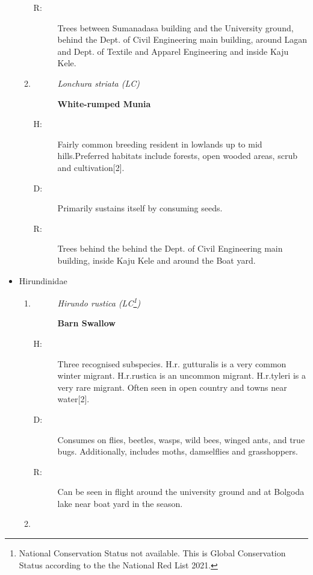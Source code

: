 \begin{itemize}
\begin{enumerate}
\begin{description}
\item[R: ]%
Trees between Sumanadasa building and the University ground, behind the Dept. of Civil Engineering main building, around Lagan and Dept. of Textile and Apparel Engineering and inside Kaju Kele.%
\end{description}%
\item%
\begin{description}%
\item[]%
\textit{Lonchura striata (LC)}%
\item[]%
\textbf{White{-}rumped Munia}%
\end{description}%
\begin{description}%
\item[H: ]%
Fairly common breeding resident in lowlands up to mid hills.Preferred habitats include forests, open wooded areas, scrub and cultivation{[}2{]}.%
\item[D: ]%
Primarily sustains itself by consuming seeds.%
\item[R: ]%
Trees behind the behind the Dept. of Civil Engineering main building, inside Kaju Kele and around the Boat yard.%
\end{description}%
\end{enumerate}%
\item%
Hirundinidae%
\begin{enumerate}%
\item%
\begin{description}%
\item[]%
\textit{Hirundo rustica (LC\footnote{National Conservation Status not available. This is Global Conservation Status according to the the National Red List 2021.})}%
\item[]%
\textbf{Barn Swallow}%
\end{description}%
\begin{description}%
\item[H: ]%
Three recognised subspecies. H.r. gutturalis is a very common winter migrant. H.r.rustica is an uncommon migrant. H.r.tyleri is a very rare migrant. Often seen in open country and towns near water{[}2{]}.%
\item[D: ]%
Consumes on flies, beetles, wasps, wild bees, winged ants, and true bugs. Additionally, includes moths, damselflies and grasshoppers.%
\item[R: ]%
Can be seen in flight around the university ground and at Bolgoda lake near boat yard in the season.%
\end{description}%
\item%

\end{enumerate}
\end{itemize}
